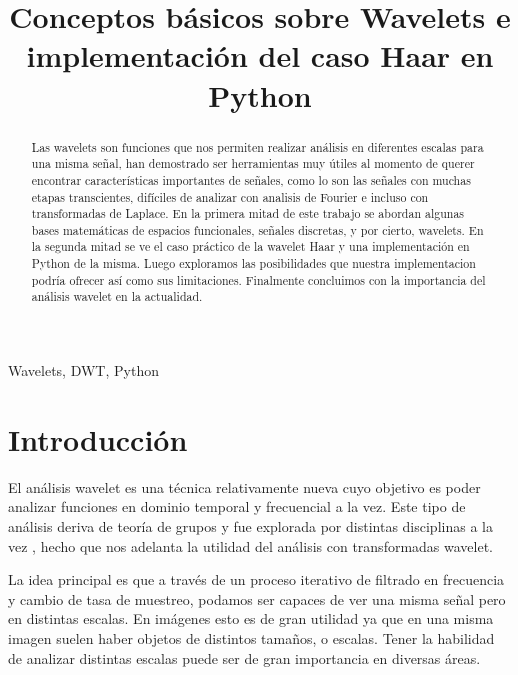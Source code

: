 \documentclass[conference]{IEEEtran}
\begin{document}
\title{Conceptos básicos sobre Wavelets e implementación del caso Haar en Python}


\author{
}

\maketitle

\begin{abstract}


Las wavelets son funciones que nos permiten realizar análisis en diferentes escalas para una misma señal, han demostrado ser herramientas muy útiles al momento de querer encontrar características importantes de señales, como lo son las señales con muchas etapas transcientes, difíciles de analizar con analisis de Fourier e incluso con transformadas de Laplace. En la primera mitad de este trabajo se abordan algunas bases matemáticas de espacios funcionales, señales discretas, y por cierto, wavelets. En la segunda mitad se ve el caso práctico de la wavelet Haar y una implementación en Python de la misma. Luego exploramos las posibilidades que nuestra implementacion podría ofrecer así como sus limitaciones. Finalmente concluimos con la importancia del análisis wavelet en la actualidad.
\end{abstract}

\begin{IEEEkeywords}
Wavelets, DWT, Python
\end{IEEEkeywords}

\section{Introducción}


El análisis wavelet es una técnica relativamente nueva   \cite{tenlectures} cuyo objetivo es poder analizar funciones en dominio temporal y frecuencial a la vez. Este tipo de análisis deriva de teoría de grupos   \cite{turbulence} y fue explorada por distintas disciplinas a la vez  \cite{tenlectures}, hecho que nos adelanta la utilidad del análisis con transformadas wavelet.

La idea principal es que a través de un proceso iterativo de filtrado en frecuencia y cambio de tasa de muestreo, podamos ser capaces de ver una misma señal pero en distintas escalas. En imágenes esto es de gran utilidad ya que en una misma imagen suelen haber objetos de distintos tamaños, o escalas. Tener la habilidad de analizar distintas escalas puede ser de gran importancia en diversas áreas.
\end{document}
